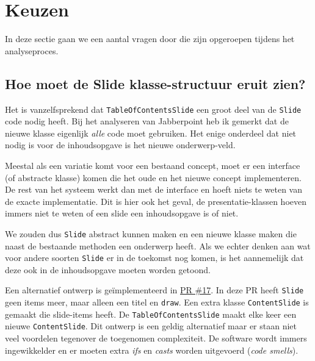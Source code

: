 \documentclass[a4paper]{article}
\newcommand{\question}[1]{
  \subsection{#1}
}
\newcommand{\code}[1]{\lstinline[columns=fixed]{#1}}
\begin{document}
\section{Keuzen}\label{sec:keuzen}
    In deze sectie gaan we een aantal vragen door die zijn opgeroepen tijdens het analyseproces.
    
    \question{Hoe moet de Slide klasse-structuur eruit zien?}
    Het is vanzelfsprekend dat \code{TableOfContentsSlide} een groot deel van de \code{Slide} code nodig heeft.
    Bij het analyseren van Jabberpoint heb ik gemerkt dat de nieuwe klasse eigenlijk \textit{alle} code moet gebruiken.
    Het enige onderdeel dat niet nodig is voor de inhoudsopgave is het nieuwe onderwerp-veld.
    
    Meestal als een variatie komt voor een bestaand concept, moet er een interface (of abstracte klasse) komen die het oude en het nieuwe concept implementeren.
    De rest van het systeem werkt dan met de interface en hoeft niets te weten van de exacte implementatie.
    Dit is hier ook het geval, de presentatie-klassen hoeven immers niet te weten of een slide een inhoudsopgave is of niet.
    
    We zouden dus \code{Slide} abstract kunnen maken en een nieuwe klasse maken die naast de bestaande methoden een onderwerp heeft.
    Als we echter denken aan wat voor andere soorten \code{Slide} er in de toekomst nog komen, is het aannemelijk dat deze ook in de inhoudsopgave moeten worden getoond.
    
    Een alternatief ontwerp is geïmplementeerd in \hyperlink{https://github.com/DanielSchiavini/design-patterns-assignment/pull/17}{PR \#17}.
    In deze PR heeft \code{Slide} geen items meer, maar alleen een titel en \code{draw}.
    Een extra klasse \code{Content}\-\code{Slide} is gemaakt die slide-items heeft.
    De \code{TableOfContentsSlide} maakt elke keer een nieuwe \code{ContentSlide}.
    Dit ontwerp is een geldig alternatief maar er staan niet veel voordelen tegenover de toegenomen complexiteit.
    De software wordt immers ingewikkelder en er moeten extra \textit{ifs} en \textit{casts} worden uitgevoerd (\textit{code smells}).

\end{document}
